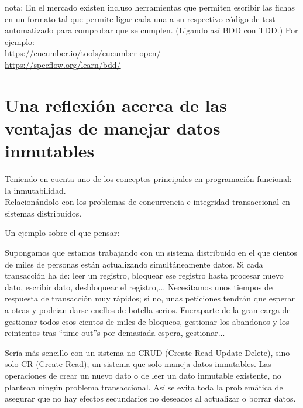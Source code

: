 \documentclass[spanish,12pt,a4paper,final,oneside]{book}
\begin{document}
\begin{longtable}{|p{7cm}|p{7cm}|}
\\ \hline
                

\end{longtable}



nota: En el mercado existen incluso herramientas que permiten escribir las fichas en un formato tal que permite ligar cada una a su respectivo código de test automatizado para comprobar que se cumplen. (Ligando así BDD con TDD.) Por ejemplo:
\\ \url{https://cucumber.io/tools/cucumber-open/}
\\ \url{https://specflow.org/learn/bdd/}



\newpage
\section{Una reflexión acerca de las ventajas de manejar datos inmutables}

Teniendo en cuenta uno de los conceptos principales en programación funcional: la inmutabilidad.
\\Relacionándolo con los problemas de concurrencia e integridad transaccional en sistemas distribuidos.

Un ejemplo sobre el que pensar:

Supongamos que estamos trabajando con un sistema distribuido en el que cientos de miles de personas están actualizando simultáneamente datos. Si cada transacción ha de: leer un registro, bloquear ese registro hasta procesar nuevo dato, escribir dato, desbloquear el registro,... 
Necesitamos unos tiempos de respuesta de transacción muy rápidos; si no, unas peticiones tendrán que esperar a otras y podrian darse cuellos de botella serios. Fueraparte de la gran carga de gestionar todos esos cientos de miles de bloqueos, gestionar los abandonos y los reintentos tras ``time-out''s por demasiada espera, gestionar...

Sería más sencillo con un sistema no CRUD (Create-Read-Update-Delete), sino solo CR (Create-Read); un sistema que solo maneja datos inmutables. Las operaciones de crear un nuevo dato o de leer un dato inmutable existente, no plantean ningún problema transaccional. Así se evita toda la problemática de asegurar que no hay efectos secundarios no deseados al actualizar o borrar datos. 
\end{document}
